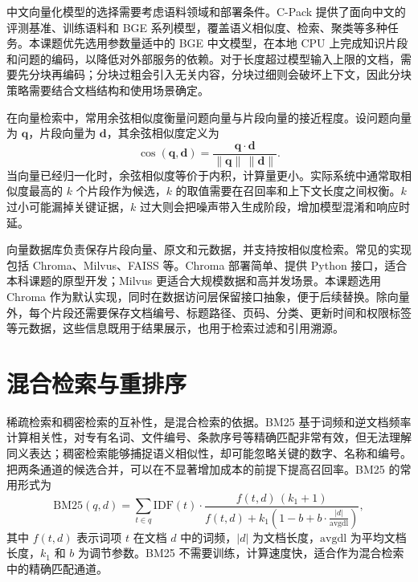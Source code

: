 中文向量化模型的选择需要考虑语料领域和部署条件。C-Pack 提供了面向中文的评测基准、训练语料和 BGE 系列模型，覆盖语义相似度、检索、聚类等多种任务。本课题优先选用参数量适中的 BGE 中文模型，在本地 CPU 上完成知识片段和问题的编码，以降低对外部服务的依赖。对于长度超过模型输入上限的文档，需要先分块再编码；分块过粗会引入无关内容，分块过细则会破坏上下文，因此分块策略需要结合文档结构和使用场景确定。

在向量检索中，常用余弦相似度衡量问题向量与片段向量的接近程度。设问题向量为 $\mathbf{q}$，片段向量为 $\mathbf{d}$，其余弦相似度定义为
\begin{equation}
  \cos(\mathbf{q},\mathbf{d})=\frac{\mathbf{q}\cdot\mathbf{d}}{\lVert\mathbf{q}\rVert\,\lVert\mathbf{d}\rVert}.
  \label{eq:cosine}
\end{equation}
当向量已经归一化时，余弦相似度等价于内积，计算量更小。实际系统中通常取相似度最高的 $k$ 个片段作为候选，$k$ 的取值需要在召回率和上下文长度之间权衡。$k$ 过小可能漏掉关键证据，$k$ 过大则会把噪声带入生成阶段，增加模型混淆和响应时延。

向量数据库负责保存片段向量、原文和元数据，并支持按相似度检索。常见的实现包括 Chroma、Milvus、FAISS 等。Chroma 部署简单、提供 Python 接口，适合本科课题的原型开发；Milvus 更适合大规模数据和高并发场景。本课题选用 Chroma 作为默认实现，同时在数据访问层保留接口抽象，便于后续替换。除向量外，每个片段还需要保存文档编号、标题路径、页码、分类、更新时间和权限标签等元数据，这些信息既用于结果展示，也用于检索过滤和引用溯源。

\section{混合检索与重排序}
\label{sec:hybrid}

稀疏检索和稠密检索的互补性，是混合检索的依据。BM25 基于词频和逆文档频率计算相关性，对专有名词、文件编号、条款序号等精确匹配非常有效，但无法理解同义表达；稠密检索能够捕捉语义相似性，却可能忽略关键的数字、名称和编号。把两条通道的候选合并，可以在不显著增加成本的前提下提高召回率。BM25 的常用形式为
\begin{equation}
  \mathrm{BM25}(q,d)=\sum_{t\in q}\mathrm{IDF}(t)\cdot
  \frac{f(t,d)\,(k_1+1)}{f(t,d)+k_1\left(1-b+b\cdot\frac{\lvert d\rvert}{\mathrm{avgdl}}\right)},
  \label{eq:bm25}
\end{equation}
其中 $f(t,d)$ 表示词项 $t$ 在文档 $d$ 中的词频，$\lvert d\rvert$ 为文档长度，$\mathrm{avgdl}$ 为平均文档长度，$k_1$ 和 $b$ 为调节参数。BM25 不需要训练，计算速度快，适合作为混合检索中的精确匹配通道。

